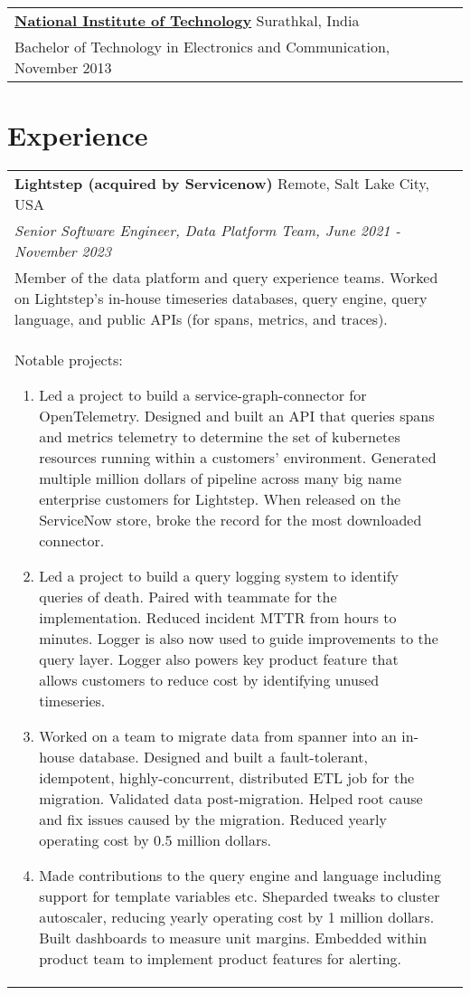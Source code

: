 \documentclass[margin,line]{res}
\begin{document}
\begin{resume}
 \vspace{-7pt}
 \begin{tabular}{@{}p{5.5in}p{4in}}
 {\bf \href{http://www.ece.nitk.ac.in/}{National Institute of
 Technology}} \dotfill Surathkal, India
 \\ {\small Bachelor of Technology in Electronics and Communication, November 2013}
 \end{tabular}

\section{\sc Experience}
\begin{tabular}{@{}p{5.5in}p{4in}}
{\bf Lightstep (acquired by Servicenow)} \dotfill Remote, Salt Lake City, USA \\
{\small\em Senior Software Engineer, Data Platform Team, June 2021 -
November 2023} \\
{\small Member of the data platform and query experience teams. Worked
on Lightstep's in-house timeseries databases, query engine, query
language, and public APIs (for spans, metrics, and traces).} \\

\vspace{-1pt}
{\small
Notable projects:
\begin{enumerate}
\item Led a project to build a service-graph-connector for
OpenTelemetry. Designed and built an API that queries spans and metrics
telemetry to determine the set of kubernetes resources running within a
customers' environment. Generated multiple million dollars of pipeline
across many big name enterprise customers for Lightstep. When released on
the ServiceNow store, broke the record for the most downloaded connector.
\item Led a project to build a query logging system to identify queries of death.
Paired with teammate for the implementation. Reduced incident
MTTR from hours to minutes. Logger is also now
used to guide improvements to the query layer. Logger also powers key
product feature that allows customers to reduce cost by identifying unused
timeseries.
\item Worked on a team to migrate data from spanner into an in-house
database. Designed and built a fault-tolerant, idempotent, highly-concurrent,
distributed ETL job for the migration. Validated data post-migration.
Helped root cause and fix issues caused by the migration.
Reduced yearly operating cost by 0.5 million dollars.
\item Made contributions to the query engine and language including
support for template variables etc. Sheparded tweaks to cluster
autoscaler, reducing yearly operating cost by 1 million dollars.
Built dashboards to measure unit margins. Embedded within product team
to implement product features for alerting.
\end{enumerate}
}\\
\end{tabular}


\end{resume}
\end{document}
